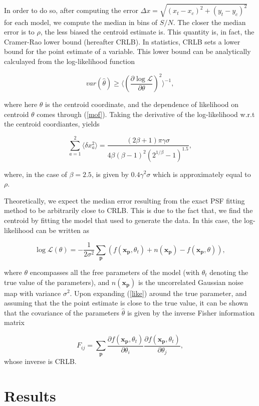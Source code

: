 \documentclass[12pt, preprint]{aastex}
\newcommand{\beq}{\begin{equation}}
\newcommand{\eeq}{\end{equation}}
\begin{document}
In order to do so, after computing the error $\Delta x = \sqrt{(x_{t}-x_{c})^2 + (y_{t}-y_{c})^2}$ for each model, we compute the median in bins of $S/N$. The closer the median error is to $\rho$, the less biased the centroid estimate is. This quantity is, in fact, the Cramer-Rao lower bound (hereafter CRLB). In statistics, CRLB sets a lower bound for the point estimate of a variable. This lower bound can be analytically calculayed from the log-likelihood function 

\beq
var(\hat{\theta}) \geq \langle (\frac{\partial \log \mathcal{L}}{\partial \theta})^{2}\rangle^{-1},
\eeq

where here $\theta$ is the centroid coordinate, and the dependence of likelihood on centroid $\theta$ comes through (\ref{mof}). Taking the derivative of the log-likelihood w.r.t the centroid coordiantes, yields

\beq
\sum_{a=1}^{2} \langle \delta x_{a}^{2} \rangle = \frac{(2\beta + 1)\pi \gamma \sigma}{4 \beta (\beta-1)^{2}(2^{1/\beta}-1)^{1.5}},
\eeq

where, in the case of $\beta = 2.5$, is given by $0.4\gamma^{2}\sigma$ which is approximately equal to $\rho$.

Theoretically, we expect the median error resulting from the exact PSF fitting method to be arbitrarily close to CRLB. This is due to the fact that, we find the centroid by fitting the model that used to generate the data. In this case, the log-likelihood can be written as

\beq
\log \mathcal{L}(\theta) = -\frac{1}{2\sigma^{2}}\sum_{\mathbf{p}}(f(\mathbf{x}_{\mathbf{p}},\theta_{t})+ n(\mathbf{x}_{\mathbf{p}}) - f(\mathbf{x}_{\mathbf{p}},\theta)),
\label{like}
\eeq  

where $\theta$ encompasses all the free parameters of the model (with $\theta_{t}$ denoting the true value of the parameters), and $n(\mathbf{x}_{\mathbf{p}})$ is the uncorrelated Gaussian noise map with variance $\sigma^{2}$. Upon expanding (\ref{like}) around the true parameter, and assuming that the the point estimate is close to the true value, it can be shown that the covariance of the parameters $\hat{\theta}$ is given by the inverse Fisher information matrix

\beq
F_{ij} = \sum_{\mathbf{p}}\frac{\partial f(\mathbf{x}_{\mathbf{p}},\theta_{t})}{\partial \theta_{i}}\frac{\partial f(\mathbf{x}_{\mathbf{p}},\theta_{t})}{\partial \theta_{j}},
\eeq 
whose inverse is CRLB.


\section{Results}\label{sec:results}
\end{document}
